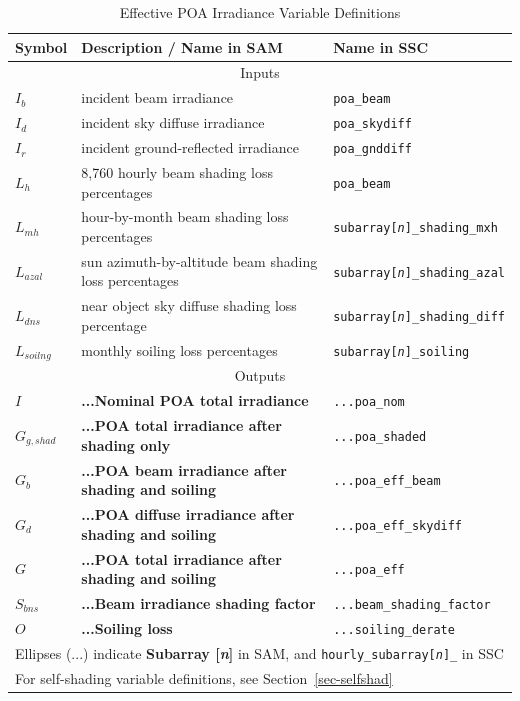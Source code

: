\documentclass[12pt,letterpaper]{article}
\begin{document}
\begin{table}
\begin{center}
\caption{Effective POA Irradiance Variable Definitions}
\begin{tabular}{lll}
\midrule
Symbol & Description / \textbf{Name in SAM} & Name in SSC\\
\midrule
\multicolumn{3}{c}{Inputs}\\
$I_b$ & incident beam irradiance  & \texttt{poa\_beam}\\
$I_d$ & incident sky diffuse irradiance & \texttt{poa\_skydiff}\\
$I_r$ & incident ground-reflected irradiance & \texttt{poa\_gnddiff}\\
$L_h$ & 8,760 hourly beam shading loss percentages  & \texttt{poa\_beam}\\
$L_{mh}$ & hour-by-month beam shading loss percentages & \texttt{subarray[\textit{n}]\_shading\_mxh}\\
$L_{azal}$ & sun azimuth-by-altitude beam shading loss percentages & \texttt{subarray[\textit{n}]\_shading\_azal}\\
$L_{dns}$ & near object sky diffuse shading loss percentage  & \texttt{subarray[\textit{n}]\_shading\_diff}\\
$L_{soilng}$ & monthly soiling loss percentages  & \texttt{subarray[\textit{n}]\_soiling}\\
\midrule
\multicolumn{3}{c}{Outputs}\\
$I$ & \textbf{...Nominal POA total irradiance} & \texttt{...poa\_nom}\\
$G_{g,shad}$ & \textbf{...POA total irradiance after shading only} & \texttt{...poa\_shaded}\\
$G_b$ & \textbf{...POA beam irradiance after shading and soiling} & \texttt{...poa\_eff\_beam}\\
$G_d$ & \textbf{...POA diffuse irradiance after shading and soiling} & \texttt{...poa\_eff\_skydiff}\\
$G$ & \textbf{...POA total irradiance after shading and soiling} & \texttt{...poa\_eff}\\
$S_{bns}$ & \textbf{...Beam irradiance shading factor} & \texttt{...beam\_shading\_factor}\\
$O$ & \textbf{...Soiling loss} & \texttt{...soiling\_derate}\\
\midrule
\multicolumn{3}{l}{Ellipses (...) indicate \textbf{Subarray [\textit{n}]} in SAM, and \texttt{hourly\_subarray[\textit{n}]\_} in SSC}\\
\multicolumn{3}{l}{For self-shading variable definitions, see Section~\ref{sec-selfshad}}\\
\end{tabular}
\label{tab-effectiveirradiancevars}
\end{center}
\end{table}
\end{document}
